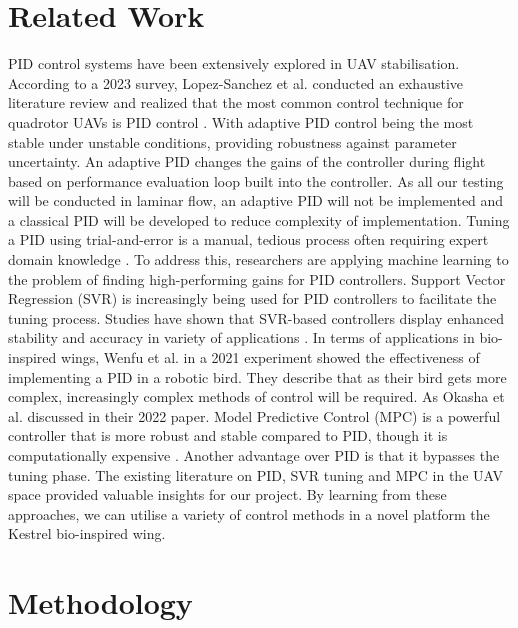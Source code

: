 \section{Related Work}
    PID control systems have been extensively explored in UAV
    stabilisation. According to a 2023 survey, Lopez-Sanchez et al.
    conducted an exhaustive literature review and realized that the most
    common control technique for quadrotor UAVs is PID control \cite{7}. With
    adaptive PID control being the most stable under unstable conditions,
    providing robustness against parameter uncertainty. An adaptive PID
    changes the gains of the controller during flight based on performance
    evaluation loop built into the controller. As all our testing will be
    conducted in laminar flow, an adaptive PID will not be implemented and a
    classical PID will be developed to reduce complexity of implementation.
    \vspace{\baselineskip}
    Tuning a PID using trial-and-error is a manual, tedious process often
    requiring expert domain knowledge \cite{6}. To address this, researchers are
    applying machine learning to the problem of finding high-performing gains
    for PID controllers. Support Vector Regression (SVR) is increasingly being
    used for PID controllers to facilitate the tuning process. Studies have
    shown that SVR-based controllers display enhanced stability and accuracy
    in variety of applications \cite{8}.
    \vspace{\baselineskip}
    In terms of applications in bio-inspired wings, Wenfu et al.\cite{9} in a 2021
    experiment showed the effectiveness of implementing a PID in a robotic
    bird. They describe that as their bird gets more complex, increasingly
    complex methods of control will be required. 
    \vspace{\baselineskip}
    As Okasha et al. discussed in their 2022 paper. Model Predictive Control
    (MPC) is a powerful controller that is more robust and stable compared
    to PID, though it is computationally expensive \cite{10}. Another advantage
    over PID is that it bypasses the tuning phase.
    \vspace{\baselineskip}
    The existing literature on PID, SVR tuning and MPC in the UAV space
    provided valuable insights for our project. By learning from these
    approaches, we can utilise a variety of control methods in a novel
    platform the Kestrel bio-inspired wing.

\section{Methodology}
